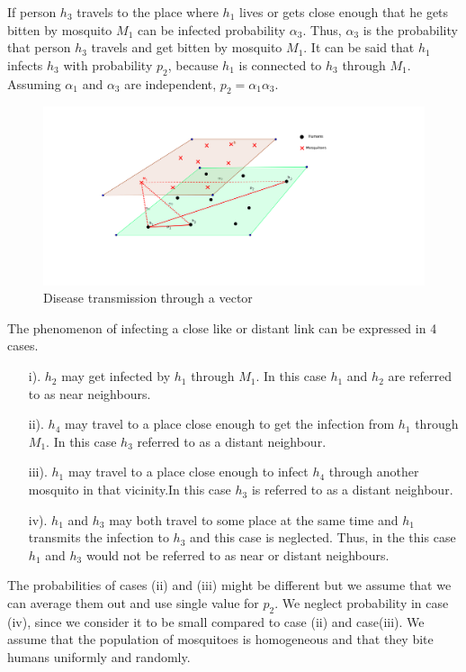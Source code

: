  If person $h_3$ travels to the place where $h_1$ lives or gets close enough that he gets bitten by mosquito $M_1$ can be infected probability $\alpha_3$. Thus, $\alpha_3$ is the probability that person $h_3$ travels and get bitten by mosquito $M_1$. It can be said that $h_1$ infects $h_3$ with probability $p_2$, because $h_1$ is connected to $h_3$ through $M_1$. Assuming $\alpha_1$ and $\alpha_3$ are independent, $p_2 = \alpha_1 \alpha_3$.
\begin{figure}[h!]
\centering
\includegraphics[scale=1]{images/human_mosquito.png}
\caption{Disease transmission through a vector} \label{fig5}
\end{figure}
The phenomenon of infecting a close like  or distant link can be expressed in 4 cases.


\begin{itemize}
\item[i).] $h_2$ may get infected by $h_1$ through $M_1$. In this case $h_1$ and $h_2$ are referred to as near neighbours.
\item[ii).] $h_4$ may travel to a place close enough to get the infection from $h_1$ through $M_1$. In this case $h_3$  referred to as a distant neighbour.
\item[iii).] $ h_1$ may travel to a place close enough to infect $h_4$  through another mosquito in that vicinity.In this case $h_3$ is  referred to as a distant neighbour.
\item[iv).] $h_1$  and $h_3$ may both travel to some place at the same time and $h_1$ transmits the infection to $h_3$ and this case is neglected. Thus, in the this case $h_1$ and $h_3$ would not be referred to as near or distant neighbours.
\end{itemize}

The probabilities of cases (ii) and (iii)
might be different but we assume that we can average them out and   use single value for $p_2$. We neglect probability in case (iv), since we consider it to be small compared to case (ii) and case(iii). We assume that the population of mosquitoes is homogeneous and that they bite humans uniformly and randomly.

